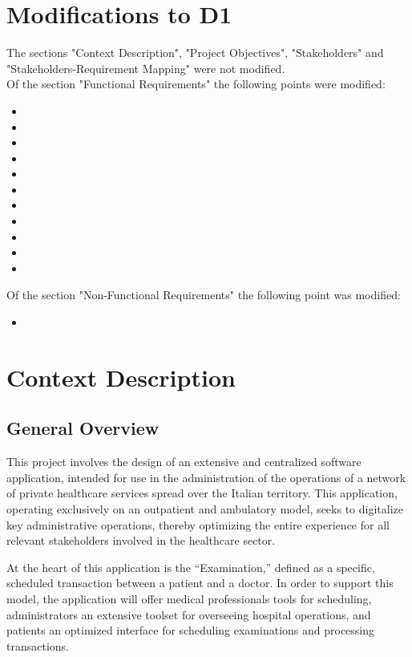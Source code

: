 \documentclass[12pt, a4paper]{article}
\begin{document}
\section{Modifications to D1}
The sections "Context Description", "Project Objectives", "Stakeholders" and "Stakeholders-Requirement Mapping" were not modified.
\\ Of the section "Functional Requirements" the following points were modified:
\begin{itemize}
    \item {}
    \item {}
    \item {}
    \item {}
    \item {}
    \item {}
    \item {}
    \item {}
    \item {}
    \item {}
    \item {}
\end{itemize}
Of the section "Non-Functional Requirements" the following point was modified:
\begin{itemize}
    \item {}
\end{itemize}

\section{Context Description}

\subsection{General Overview}
This project involves the design of an extensive and centralized software application, intended for use in the administration of the operations of a network of private healthcare services spread over the Italian territory. This application, operating exclusively on an outpatient and ambulatory model, seeks to digitalize key administrative operations, thereby optimizing the entire experience for all relevant stakeholders involved in the healthcare sector.

At the heart of this application is the ``Examination,'' defined as a specific, scheduled transaction between a patient and a doctor. In order to support this model, the application will offer medical professionals tools for scheduling, administrators an extensive toolset for overseeing hospital operations, and patients an optimized interface for scheduling examinations and processing transactions.
\end{document}

